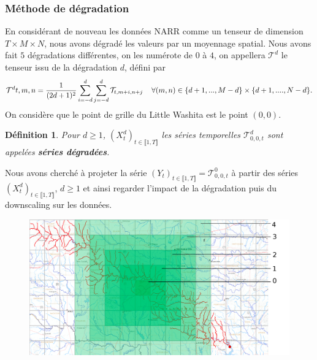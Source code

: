 \documentclass[a4paper,11pt]{article}
\numberwithin{equation}{section}
\newtheorem{definition}{Définition}
\begin{document}
\subsubsection{Méthode de dégradation}

En considérant de nouveau les données NARR comme un tenseur de dimension $T\times M \times N$,
nous avons dégradé les valeurs par un moyennage spatial. Nous avons fait $5$ dégradations différentes, on les numérote de $0$ à $4$, on appellera $\mathcal{T}^{d}$ le tenseur issu de la dégradation $d$, défini par
\begin{equation}
	\label{eq-degradation}
	\mathcal{T}^{d}{t,m,n}=\frac{1}{(2d+1)^2} \sum_{i=-d}^{d}\sum_{j=-d}^{d}\mathcal{T}_{t,m+i,n+j} \hspace{4mm} \forall (m,n) \in \{d+1,...,M-d\}\times\{d+1,...., N-d\}.
\end{equation}
On considère que le point de grille du Little Washita est le point $(0,0)$. 
\begin{definition}
	\label{serie-deg}
	Pour $d\geq1$, $(X^d_t)_{t\in \llbracket 1,T \rrbracket}$ les séries temporelles $\mathcal{T}^{d}_{0,0,t}$ sont appelées \textbf{séries dégradées}.
\end{definition}

Nous avons cherché à projeter la série $(Y_t)_{t \in \llbracket 1,T \rrbracket}= \mathcal{T}^{0}_{0,0,t}$ à partir des séries $(X^d_t)_{t\in \llbracket 1,T \rrbracket}$, $d\geq 1$ et ainsi regarder l'impact de la dégradation puis du downscaling sur les données.

\begin{figure}[H]
	\begin{center}
		\includegraphics[scale=0.3]{Little_Washita_deg.png}
	\end{center}
	\label{fig-Little-Washita-deg}
\end{figure}
\end{document}
